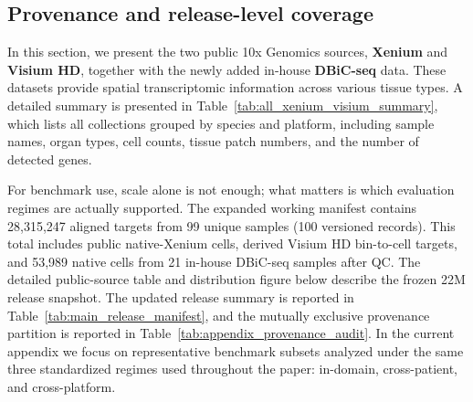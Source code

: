 \documentclass[sigconf,review]{acmart}
\begin{document}
\subsection{Provenance and release-level coverage}
\label{sec:provenance_coverage}
\noindent
In this section, we present the two public 10x Genomics sources,
\textbf{Xenium} and \textbf{Visium HD}, together with the newly added in-house
\textbf{DBiC-seq} data.
These datasets provide spatial transcriptomic information across various tissue types.
A detailed summary is presented in Table~\ref{tab:all_xenium_visium_summary}, which lists all collections grouped by species and platform, including sample names, organ types, cell counts, tissue patch numbers, and the number of detected genes.

For benchmark use, scale alone is not enough; what matters is which evaluation
regimes are actually supported. The expanded working manifest contains
28,315,247 aligned targets from 99 unique samples (100 versioned records).
This total includes public native-Xenium cells, derived Visium HD bin-to-cell
targets, and 53,989 native cells from 21 in-house DBiC-seq samples after QC.
The detailed public-source table and distribution figure below describe the
frozen 22M release snapshot. The updated release summary is reported in
Table~\ref{tab:main_release_manifest}, and the mutually exclusive provenance
partition is reported in Table~\ref{tab:appendix_provenance_audit}. In the
current appendix we focus on representative benchmark subsets analyzed under
the same three standardized regimes used throughout the paper: in-domain,
cross-patient, and cross-platform.
\end{document}
